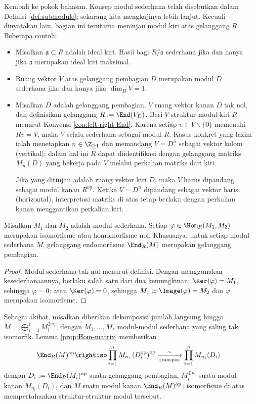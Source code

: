 Kembali ke pokok bahasan. Konsep modul sederhana telah disebutkan dalam Definisi \ref{def:submodule}; sekarang kita mengkajinya lebih lanjut. Kecuali dinyatakan lain, bagian ini terutama meninjau modul kiri atas gelanggang $R$. Beberapa contoh:
\begin{itemize}
	\item Misalkan $\mathfrak{a} \subset R$ adalah ideal kiri. Hasil bagi $R/\mathfrak{a}$ sederhana jika dan hanya jika $\mathfrak{a}$ merupakan ideal kiri maksimal.
	\item Ruang vektor $V$ atas gelanggang pembagian $D$ merupakan modul $D$ sederhana jika dan hanya jika $\dim_D V = 1$.
	\item Misalkan $D$ adalah gelanggang pembagian, $V$ ruang vektor kanan $D$ tak nol, dan definisikan gelanggang $R := \End(V_D)$. Beri $V$ struktur modul kiri $R$ menurut Konvensi \ref{con:left-right-End}. Karena setiap $v \in V \smallsetminus \{0\}$ memenuhi $Rv = V$, maka $V$ selalu sederhana sebagai modul $R$. Kasus konkret yang lazim ialah menetapkan $n \in \Z_{\geq 1}$ dan memandang $V = D^n$ sebagai vektor kolom (vertikal); dalam hal ini $R$ dapat diidentifikasi dengan gelanggang matriks $M_n(D)$ yang bekerja pada $V$ melalui perkalian matriks dari kiri.

	Jika yang ditinjau adalah ruang vektor kiri $D$, maka $V$ harus dipandang sebagai modul kanan $R^\text{op}$. Ketika $V = D^n$ dipandang sebagai vektor baris (horizontal), interpretasi matriks di atas tetap berlaku dengan perkalian kanan menggantikan perkalian kiri.
\end{itemize}

\begin{lemma}\label{prop:Schur-mod}
	Misalkan $M_1$ dan $M_2$ adalah modul sederhana. Setiap $\varphi \in \Hom_R(M_1, M_2)$ merupakan isomorfisme atau homomorfisme nol. Khususnya, untuk setiap modul sederhana $M$, gelanggang endomorfisme $\End_R(M)$ merupakan gelanggang pembagian.
\end{lemma}
\begin{proof}
	Modul sederhana tak nol menurut definisi. Dengan menggunakan kesederhanaannya, berlaku salah satu dari dua kemungkinan: $\Ker(\varphi) = M_1$, sehingga $\varphi=0$; atau $\Ker(\varphi)=0$, sehingga $M_1 \simeq \Image(\varphi) = M_2$ dan $\varphi$ merupakan isomorfisme.
\end{proof}

Sebagai akibat, misalkan diberikan dekomposisi jumlah langsung hingga $M = \bigoplus_{i=1}^r M_i^{\oplus n_i}$, dengan $M_1, \ldots, M_r$ modul-modul sederhana yang saling tak isomorfik. Lemma \ref{prop:Hom-matrix} memberikan
\[ \End_R(M)^{\text{op}} \rightiso \prod_{i=1}^n M_{n_i}\left(D_i^{\text{op}}\right)^{\text{op}} \xrightarrow[\text{transpos}]{\sim} \prod_{i=1}^n M_{n_i}(D_i) \]
dengan $D_i := \End_R(M_i)^\text{op}$ suatu gelanggang pembagian, $M_i^{\oplus n_i}$ suatu modul kanan $M_{n_i}(D_i)$, dan $M$ suatu modul kanan $\End_R(M)^\text{op}$; isomorfisme di atas mempertahankan struktur-struktur modul tersebut.


